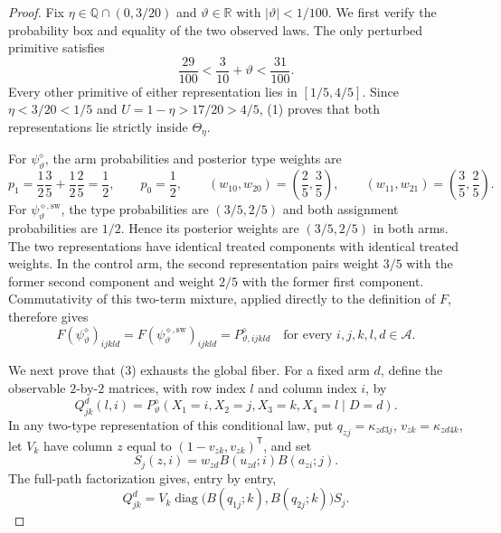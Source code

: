 \documentclass{article}
\begin{document}
\begin{proof}
Fix \(\eta\in\mathbb Q\cap(0,3/20)\) and \(\vartheta\in\mathbb R\) with \(|\vartheta|<1/100\). We first verify the probability box and equality of the two observed laws. The only perturbed primitive satisfies
\[
 \frac{29}{100}<\frac{3}{10}+\vartheta<\frac{31}{100}.
 \tag{1}
\]
Every other primitive of either representation lies in \([1/5,4/5]\). Since \(\eta<3/20<1/5\) and \(U=1-\eta>17/20>4/5\), (1) proves that both representations lie strictly inside \(\Theta_\eta\).

For \(\psi^{\diamond}_{\vartheta}\), the arm probabilities and posterior type weights are
\[
 p_1=\frac12\frac35+\frac12\frac25=\frac12,
 \qquad p_0=\frac12,
 \qquad (w_{10},w_{20})=\left(\frac25,\frac35\right),
 \qquad (w_{11},w_{21})=\left(\frac35,\frac25\right).
 \tag{2}
\]
For \(\psi^{\diamond,\mathrm{sw}}_{\vartheta}\), the type probabilities are \((3/5,2/5)\) and both assignment probabilities are \(1/2\). Hence its posterior weights are \((3/5,2/5)\) in both arms. The two representations have identical treated components with identical treated weights. In the control arm, the second representation pairs weight \(3/5\) with the former second component and weight \(2/5\) with the former first component. Commutativity of this two-term mixture, applied directly to the definition of \(F\), therefore gives
\[
 F(\psi^{\diamond}_{\vartheta})_{ijkld}
 =F(\psi^{\diamond,\mathrm{sw}}_{\vartheta})_{ijkld}
 =P^{\diamond}_{\vartheta,ijkld}
 \quad\text{for every }i,j,k,l,d\in\mathcal A.
 \tag{3}
\]

We next prove that (3) exhausts the global fiber. For a fixed arm \(d\), define the observable \(2\)-by-\(2\) matrices, with row index \(l\) and column index \(i\), by
\[
 Q_{jk}^{d}(l,i)=P^{\diamond}_{\vartheta}(X_1=i,X_2=j,X_3=k,X_4=l\mid D=d).
\]
In any two-type representation of this conditional law, put \(q_{zj}=\kappa_{zd3j}\), \(v_{zk}=\kappa_{zd4k}\), let \(V_k\) have column \(z\) equal to \((1-v_{zk},v_{zk})^{\mathsf T}\), and set
\[
 S_j(z,i)=w_{zd}B(u_{zd};i)B(a_{zi};j).
\]
The full-path factorization gives, entry by entry,
\[
 Q_{jk}^{d}=V_k\operatorname{diag}\bigl(B(q_{1j};k),B(q_{2j};k)\bigr)S_j.
 \tag{4}
\]


\end{proof}
\end{document}
